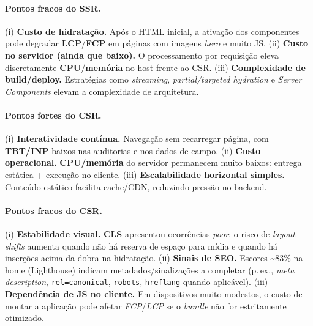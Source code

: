 \paragraph{Pontos fracos do SSR.}
(i) \textbf{Custo de hidratação.} Após o HTML inicial, a ativação dos componentes pode degradar \textbf{LCP}/\textbf{FCP} em páginas com imagens \emph{hero} e muito JS.  
(ii) \textbf{Custo no servidor (ainda que baixo).} O processamento por requisição eleva discretamente \textbf{CPU}/\textbf{memória} no host frente ao CSR.  
(iii) \textbf{Complexidade de build/deploy.} Estratégias como \emph{streaming}, \emph{partial/targeted hydration} e \emph{Server Components} elevam a complexidade de arquitetura.

\paragraph{Pontos fortes do CSR.}
(i) \textbf{Interatividade contínua.} Navegação sem recarregar página, com \textbf{TBT/INP} baixos nas auditorias e nos dados de campo.  
(ii) \textbf{Custo operacional.} \textbf{CPU/memória} do servidor permanecem muito baixos: entrega estática + execução no cliente.  
(iii) \textbf{Escalabilidade horizontal simples.} Conteúdo estático facilita cache/CDN, reduzindo pressão no backend.

\paragraph{Pontos fracos do CSR.}
(i) \textbf{Estabilidade visual.} \textbf{CLS} apresentou ocorrências \textit{poor}; o risco de \emph{layout shifts} aumenta quando não há reserva de espaço para mídia e quando há inserções acima da dobra na hidratação.  
(ii) \textbf{Sinais de SEO.} Escores \textasciitilde83\% na home (Lighthouse) indicam metadados/sinalizações a completar (p.\,ex., \emph{meta description}, \texttt{rel=canonical}, \texttt{robots}, \texttt{hreflang} quando aplicável).  
(iii) \textbf{Dependência de JS no cliente.} Em dispositivos muito modestos, o custo de montar a aplicação pode afetar \textit{FCP}/\textit{LCP} se o \emph{bundle} não for estritamente otimizado.

